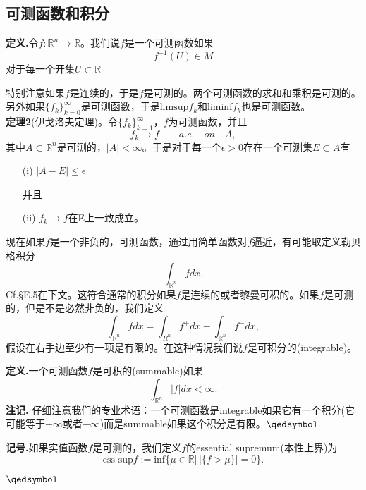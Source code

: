 \documentclass[leqno]{article}%
\begin{document}
\subsection{可测函数和积分}
\noindent\textbf{定义.}令$f:\mathbb{R}^{n}\rightarrow\mathbb{R}$。我们说$f$是一个可测函数如果
\begin{equation*}
f^{-1}(U)\in M
\end{equation*}
对于每一个开集$U\subset\mathbb{R}$\par
特别注意如果$f$是连续的，于是$f$是可测的。两个可测函数的求和和乘积是可测的。另外如果$\{f_{k}\}_{k=0}^{\infty}$是可测函数，于是$\text{limsup} f_{k}$和$\text{liminf}f_{k}$也是可测函数。
\\
\textbf{定理2}(伊戈洛夫定理)。令$\{f_{k}\}_{k=1}^{\infty}$，$f$为可测函数，并且
\begin{equation*}
f_{k}\rightarrow f\qquad  a.e.\quad on \quad A,
\end{equation*}
其中$A\subset\mathbb{R}^{n}$是可测的，$|A|<\infty$。于是对于每一个$\epsilon>0$存在一个可测集$E\subset A$有
\begin{enumerate}[fullwidth,itemindent=2em]
	\item[(i)]$|A-E|\leq \epsilon$
	{\setlength{\parindent}{2em} \par 并且}\vspace{-0.7em}
	\item[(ii)]$f_{k}\rightarrow f$在E上一致成立。 
\end{enumerate}
\par 现在如果$f$是一个非负的，可测函数，通过用简单函数对$f$逼近，有可能取定义勒贝格积分
\begin{equation*}
\int_{\mathbb{R}^{n}}fdx.
\end{equation*}
Cf.\S E.5在下文。这符合通常的积分如果$f$是连续的或者黎曼可积的。如果$f$是可测的，但是不是必然非负的，我们定义
\begin{equation*}
\int_{\mathbb{R}^{n}}fdx=\int_{R^{n}}f^{+}dx-\int_{\mathbb{R}^{n}}f^{-}dx,
\end{equation*}
假设在右手边至少有一项是有限的。在这种情况我们说$f$是可积分的(integrable)。\par
\noindent\textbf{定义.}一个可测函数$f$是可积的(summable)如果
\begin{equation*}
\int_{\mathbb{R}^{n}}|f|dx<\infty.
\end{equation*}
\textbf{注记.}
仔细注意我们的专业术语：一个可测函数是integrable如果它有一个积分(它可能等于$+\infty$或者$-\infty$)而是summable如果这个积分是有限。$\hfill\qedsymbol$\par
\noindent\textbf{记号.}如果实值函数$f$是可测的，我们定义$f$的essential supremum(本性上界)为
\begin{equation*}
\text{ess sup}f:=\text{inf}\{\mu\in\mathbb{R}|\,|\{f>\mu\}|=0\}.
\end{equation*}
\par $\hfill\qedsymbol$
\end{document}
